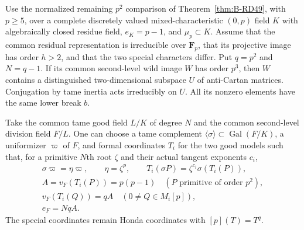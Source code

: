 \begin{lemma}
\label{lem:B-RD56-anti-layer}
Use the normalized remaining $p^2$ comparison of
Theorem~\ref{thm:B-RD49}, with $p\ge5$, over a complete discretely
valued mixed-characteristic $(0,p)$ field $K$ with algebraically
closed residue field, $e_K=p-1$, and $\mu_p\subset K$.
Assume that the common residual representation is irreducible over
$\mathbf F_p$, that its projective image has order $h>2$, and that
the two special characters differ. Put $q=p^2$ and $N=q-1$.
If its common second-level wild image $W$ has order $p^3$, then
$W$ contains a distinguished two-dimensional subspace $U$ of
anti-Cartan matrices. Conjugation by tame inertia acts irreducibly
on $U$. All its nonzero elements have the same lower break $b$.

Take the common tame good field $L/K$ of degree $N$ and the common
second-level division field $F/L$. One can choose a tame complement
$\langle\sigma\rangle\subset\operatorname{Gal}(F/K)$, a uniformizer
$\varpi$ of $F$, and formal coordinates $T_i$ for the two good
models such that, for a primitive $N$th root $\zeta$ and their
actual tangent exponents $c_i$,
\[
 \begin{gathered}
 \sigma\varpi=\eta\varpi,\qquad \eta=\zeta^p,\qquad
 T_i(\sigma P)=\zeta^{c_i}\sigma(T_i(P)),\\
 A=v_F(T_i(P))=p(p-1)\quad(P\text{ primitive of order }p^2),\\
 v_F(T_i(Q))=qA\quad(0\ne Q\in M_i[p]),\\
                         e_F=NqA.                       \tag{B-RD56.1}
 \end{gathered}
\]
The special coordinates remain Honda coordinates with $[p](T)=T^q$.
\end{lemma}
